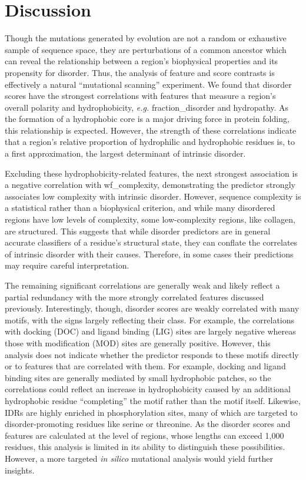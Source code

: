 \section{Discussion}
Though the mutations generated by evolution are not a random or exhaustive sample of sequence space, they are perturbations of a common ancestor which can reveal the relationship between a region's biophysical properties and its propensity for disorder. Thus, the analysis of feature and score contrasts is effectively a natural ``mutational scanning'' experiment. We found that disorder scores have the strongest correlations with features that measure a region's overall polarity and hydrophobicity, \textit{e.g.} fraction\_disorder and hydropathy. As the formation of a hydrophobic core is a major driving force in protein folding, this relationship is expected. However, the strength of these correlations indicate that a region's relative proportion of hydrophilic and hydrophobic residues is, to a first approximation, the largest determinant of intrinsic disorder.

Excluding these hydrophobicity-related features, the next strongest association is a negative correlation with wf\_complexity, demonstrating the predictor strongly associates low complexity with intrinsic disorder. However, sequence complexity is a statistical rather than a biophysical criterion, and while many disordered regions have low levels of complexity, some low-complexity regions, like collagen, are structured. This suggests that while disorder predictors are in general accurate classifiers of a residue's structural state, they can conflate the correlates of intrinsic disorder with their causes. Therefore, in some cases their predictions may require careful interpretation.

The remaining significant correlations are generally weak and likely reflect a partial redundancy with the more strongly correlated features discussed previously. Interestingly, though, disorder scores are weakly correlated with many motifs, with the signs largely reflecting their class. For example, the correlations with docking (DOC) and ligand binding (LIG) sites are largely negative whereas those with modification (MOD) sites are generally positive. However, this analysis does not indicate whether the predictor responds to these motifs directly or to features that are correlated with them. For example, docking and ligand binding sites are generally mediated by small hydrophobic patches, so the correlations could reflect an increase in hydrophobicity caused by an additional hydrophobic residue ``completing'' the motif rather than the motif itself. Likewise, IDRs are highly enriched in phosphorylation sites, many of which are targeted to disorder-promoting residues like serine or threonine. As the disorder scores and features are calculated at the level of regions, whose lengths can exceed 1,000 residues, this analysis is limited in its ability to distinguish these possibilities. However, a more targeted \textit{in silico} mutational analysis would yield further insights.

